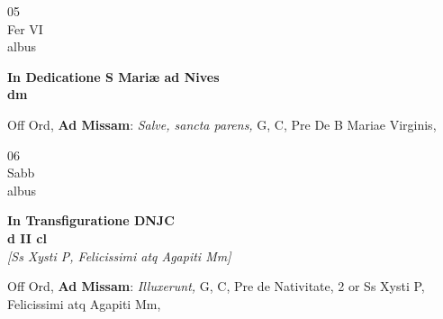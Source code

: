 \documentclass[10pt, openany]{book}
\begin{document}
        \begin{center}
            \begin{minipage}{3.5in}
                \vspace{2em}
                \begin{minipage}{0.5in}
                    {\Huge 05} \\
                    {\normalsize Fer VI} \\
                    {\normalsize albus}
                \end{minipage}
                \begin{minipage}{3.0in}
                    \textbf{ \large In Dedicatione S Mariæ ad Nives \\
                    \textnormal{\normalsize dm}} \\ 
                \end{minipage}
                \begin{justify}Off Ord, \textbf{Ad Missam}: \textit{Salve, sancta parens,} G, C, Pre De B Mariae Virginis,   
                \end{justify}
            \end{minipage}
        \end{center}
    
        \begin{center}
            \begin{minipage}{3.5in}
                \vspace{2em}
                \begin{minipage}{0.5in}
                    {\Huge 06} \\
                    {\normalsize Sabb} \\
                    {\normalsize albus}
                \end{minipage}
                \begin{minipage}{3.0in}
                    \textbf{ \large In Transfiguratione DNJC \\
                    \textnormal{\normalsize d II cl}} \\ \textit{[Ss Xysti P, Felicissimi atq Agapiti Mm]} \\ 
                \end{minipage}
                \begin{justify}Off Ord, \textbf{Ad Missam}: \textit{Illuxerunt,} G, C, Pre de Nativitate, 2 or Ss Xysti P, Felicissimi atq Agapiti Mm,   
                \end{justify}
            \end{minipage}
        \end{center}
    
\end{document}
